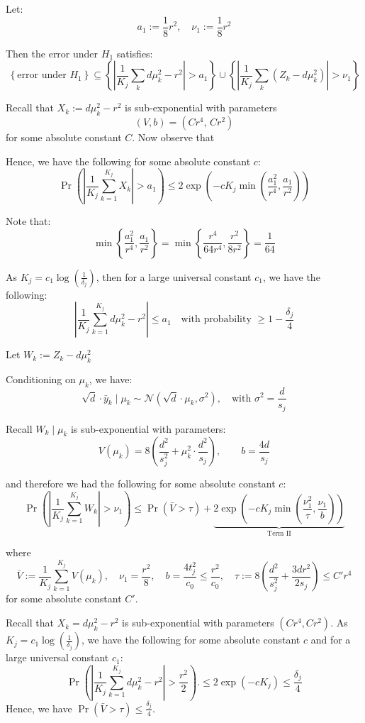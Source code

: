 Let:
\[
a_1 := \frac{1}{8} r^2, \quad \nu_1 := \frac{1}{8} r^2
\]

Then the error under $H_1$ satisfies:
\[
\left\{ \text{error under } H_1 \right\} 
\subseteq \left\{ \left| \frac{1}{K_j} \sum_k d\mu_k^2 - r^2 \right| >a_1 \right\}
\cup \left\{ \left| \frac{1}{K_j} \sum_k (Z_k - d\mu_k^2) \right| > \nu_1 \right\}
\]


Recall that $X_k := d \mu_k^2 - r^2$ is sub-exponential with parameters
\[
(V, b) = \left( C r^4, \, C r^2 \right)
\]
for some absolute constant $C$. Now observe that 

Hence, we have the following for some absolute constant $c$:
\[
\Pr\left( \left| \frac{1}{K_j} \sum_{k=1}^{K_j} X_k \right| > a_1 \right) 
\leq 2 \exp\left( -cK_j \min\left( \frac{a_1^2}{r^4}, \frac{a_1}{r^2} \right) \right)
\]

Note that:
\[
\min\left\{ \frac{a_1^2}{r^4}, \frac{a_1}{r^2} \right\} =\min\left\{ \frac{r^4}{64r^4}, \frac{r^2}{8r^2} \right\} = \frac{1}{64}
\]

As $K_j = c_1 \log \left( \frac{1}{\delta_j} \right)$, then for a large universal constant $c_1$, we have the following:
\[
\left| \frac{1}{K_j} \sum_{k=1}^{K_j} d\mu_k^2 - r^2 \right| 
\leq a_1 \quad \text{with probability } \geq 1 - \frac{\delta_j}{4}
\]

Let $W_k := Z_k - d\mu_k^2$

Conditioning on $\mu_k$, we have:
\[
\sqrt{d} \cdot \bar{y}_k \mid \mu_k \sim \mathcal{N}(\sqrt{d}\cdot\mu_k, \sigma^2), \quad \text{with } \sigma^2 = \frac{d}{s_j}
\]

Recall $W_k \mid \mu_k$ is sub-exponential with parameters:
\[
V(\mu_k) = 8 \left( \frac{d^2}{s_j^2} + \mu_k^2 \cdot \frac{d^2}{s_j} \right), \qquad b = \frac{4d}{s_j}
\]

and therefore we had the following for some absolute constant $c$:
\[
\Pr\left( \left| \frac{1}{K_j} \sum_{k=1}^{K_j} W_k \right| > \nu_1 \right)\leq \Pr(\bar{V}>\tau) + \underbrace{2 \exp\left( -cK_j \min\left( \frac{\nu_1^2}{\tau}, \frac{\nu_1}{b} \right) \right)}_{\text{Term II}}
\]

where 
\[
\bar{V} := \frac{1}{K_j} \sum_{k=1}^{K_j} V(\mu_k),\quad \nu_1 = \frac{r^2}{8}, \quad b = \frac{4t_j^2}{c_0}\leq\frac{r^2}{c_0}, \quad \tau := 8 \left( \frac{d^2}{s_j^2} + \frac{3dr^2}{2s_j}\right) \leq C'r^4
\]
for some absolute constant $C'$.

Recall that $X_k = d \mu_k^2 - r^2$ is sub-exponential with parameters $(Cr^4, Cr^2)$. As $K_j = c_1 \log \left( \frac{1}{\delta_j} \right)$, we have the following for some absolute constant $c$ and for a large universal constant $c_1$:
\[
\Pr\left( \left| \frac{1}{K_j} \sum_{k=1}^{K_j} d \mu_k^2 - r^2 \right| > \frac{r^2}{2} \right). 
\leq 2 \exp(-cK_j) \leq \frac{\delta_j}{4}
\]
 Hence, we have $\Pr(\bar{V}>\tau)\leq\frac{\delta_j}{4}$.



